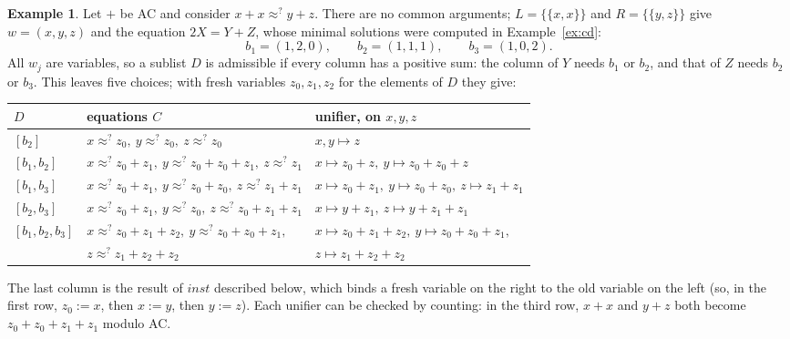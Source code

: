 \documentclass[11pt,a4paper]{article}
\theoremstyle{definition}
\newtheorem{example}[theorem]{Example}
\theoremstyle{remark}
\newcommand{\mset}[1]{\{\!\{#1\}\!\}}
\begin{document}
\begin{example}\label{ex:xxyz}
  Let $+$ be AC and consider $x + x \approx^? y + z$. There are no common arguments;
  $L = \mset{x, x}$ and $R = \mset{y, z}$ give $w = (x, y, z)$ and the equation
  $2X = Y + Z$, whose minimal solutions were computed in Example~\ref{ex:cd}:
  \[
    b_1 = (1,2,0), \qquad b_2 = (1,1,1), \qquad b_3 = (1,0,2).
  \]
  All $w_j$ are variables, so a sublist $D$ is admissible if every column has a positive sum: the
  column of $Y$ needs $b_1$ or $b_2$, and that of $Z$ needs $b_2$ or $b_3$. This leaves five
  choices; with fresh variables $z_0, z_1, z_2$ for the elements of $D$ they give:
  \begin{center}
  \footnotesize
  \begin{tabular}{@{}lll@{}}
    \toprule
    $D$ & equations $C$ & unifier, on $x, y, z$\\
    \midrule
    $[b_2]$ & $x \approx^? z_0,\ y \approx^? z_0,\ z \approx^? z_0$ & $x, y \mapsto z$\\
    $[b_1, b_2]$ & $x \approx^? z_0 + z_1,\ y \approx^? z_0 + z_0 + z_1,\ z \approx^? z_1$ &
       $x \mapsto z_0 + z,\ y \mapsto z_0 + z_0 + z$\\
    $[b_1, b_3]$ & $x \approx^? z_0 + z_1,\ y \approx^? z_0 + z_0,\ z \approx^? z_1 + z_1$ &
       $x \mapsto z_0 + z_1,\ y \mapsto z_0 + z_0,\ z \mapsto z_1 + z_1$\\
    $[b_2, b_3]$ & $x \approx^? z_0 + z_1,\ y \approx^? z_0,\ z \approx^? z_0 + z_1 + z_1$ &
       $x \mapsto y + z_1,\ z \mapsto y + z_1 + z_1$\\
    $[b_1, b_2, b_3]$ & $x \approx^? z_0 + z_1 + z_2,\ y \approx^? z_0 + z_0 + z_1,$ &
       $x \mapsto z_0 + z_1 + z_2,\ y \mapsto z_0 + z_0 + z_1,$\\
       & $z \approx^? z_1 + z_2 + z_2$ & $z \mapsto z_1 + z_2 + z_2$\\
    \bottomrule
  \end{tabular}
  \end{center}
  The last column is the result of $\mathit{inst}$ described below, which binds a fresh variable
  on the right to the old variable on the left (so, in the first row, $z_0 := x$, then
  $x := y$, then $y := z$). Each unifier can be checked by counting: in the third row,
  $x + x$ and $y + z$ both become $z_0 + z_0 + z_1 + z_1$ modulo AC.
\end{example}
\end{document}

